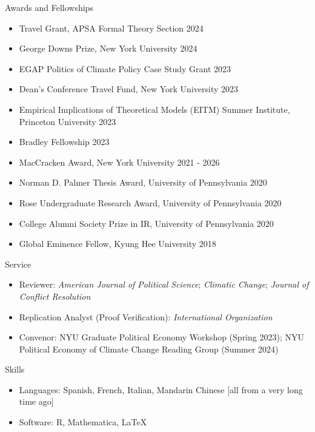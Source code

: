 \documentclass{resume} %
\begin{document}
\begin{rSection}{Awards and Fellowships}
\begin{itemize}
\item Travel Grant, APSA Formal Theory Section \hfill 2024
\item George Downs Prize, New York University \hfill 2024
\item EGAP Politics of Climate Policy Case Study Grant \hfill 2023
\item Dean's Conference Travel Fund, New York University \hfill 2023
\item Empirical Implications of Theoretical Models (EITM) Summer Institute, Princeton University \hfill 2023
\item Bradley Fellowship \hfill 2023
\item MacCracken Award, New York University \hfill 2021 - 2026
\item Norman D. Palmer Thesis Award, University of Pennsylvania \hfill 2020
\item Rose Undergraduate Research Award, University of Pennsylvania \hfill 2020
\item College Alumni Society Prize in IR, University of Pennsylvania \hfill 2020
\item Global Eminence Fellow, Kyung Hee University \hfill 2018
\end{itemize}
\end{rSection}

\begin{rSection}{Service}
\begin{itemize}
\item Reviewer:  \textit{American Journal of Political Science};  \textit{Climatic Change}; \textit{Journal of Conflict Resolution}

\item Replication Analyst (Proof Verification):  \textit{International Organization} 
\item Convenor: NYU Graduate Political Economy Workshop (Spring 2023); NYU Political Economy of Climate Change Reading Group (Summer 2024)
\end{itemize}
 \end{rSection}

\begin{rSection}{Skills}
\begin{itemize}
\item Languages: Spanish, French, Italian, Mandarin Chinese [all from a very long time ago]
\item Software: R, Mathematica, \LaTeX
\end{itemize}
\end{rSection}
\end{document}
